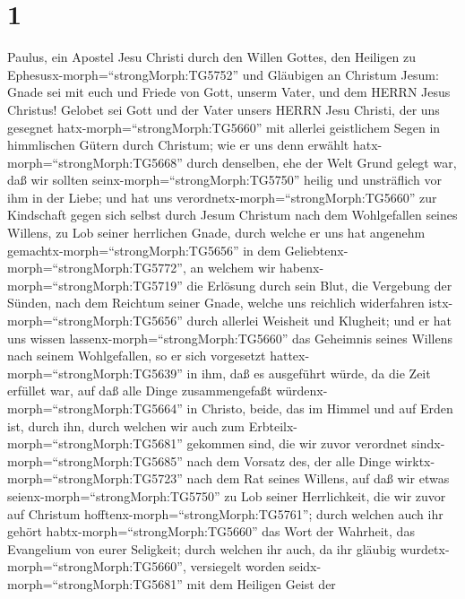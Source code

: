 \hypertarget{section}{%
\section{1}\label{section}}

 Paulus, ein Apostel Jesu Christi durch den Willen Gottes,
den Heiligen zu Ephesusx-morph=``strongMorph:TG5752'' und Gläubigen an
Christum Jesum:  Gnade sei mit euch und Friede von Gott,
unserm Vater, und dem HERRN Jesus Christus!  Gelobet sei
Gott und der Vater unsers HERRN Jesu Christi, der uns gesegnet
hatx-morph=``strongMorph:TG5660'' mit allerlei geistlichem Segen in
himmlischen Gütern durch Christum;  wie er uns denn erwählt
hatx-morph=``strongMorph:TG5668'' durch denselben, ehe der Welt Grund
gelegt war, daß wir sollten seinx-morph=``strongMorph:TG5750'' heilig
und unsträflich vor ihm in der Liebe;  und hat uns
verordnetx-morph=``strongMorph:TG5660'' zur Kindschaft gegen sich selbst
durch Jesum Christum nach dem Wohlgefallen seines Willens, 
zu Lob seiner herrlichen Gnade, durch welche er uns hat angenehm
gemachtx-morph=``strongMorph:TG5656'' in dem
Geliebtenx-morph=``strongMorph:TG5772'',  an welchem wir
habenx-morph=``strongMorph:TG5719'' die Erlösung durch sein Blut, die
Vergebung der Sünden, nach dem Reichtum seiner Gnade, 
welche uns reichlich widerfahren istx-morph=``strongMorph:TG5656'' durch
allerlei Weisheit und Klugheit;  und er hat uns wissen
lassenx-morph=``strongMorph:TG5660'' das Geheimnis seines Willens nach
seinem Wohlgefallen, so er sich vorgesetzt
hattex-morph=``strongMorph:TG5639'' in ihm,  daß es
ausgeführt würde, da die Zeit erfüllet war, auf daß alle Dinge
zusammengefaßt würdenx-morph=``strongMorph:TG5664'' in Christo, beide,
das im Himmel und auf Erden ist, durch ihn,  durch welchen
wir auch zum Erbteilx-morph=``strongMorph:TG5681'' gekommen sind, die
wir zuvor verordnet sindx-morph=``strongMorph:TG5685'' nach dem Vorsatz
des, der alle Dinge wirktx-morph=``strongMorph:TG5723'' nach dem Rat
seines Willens,  auf daß wir etwas
seienx-morph=``strongMorph:TG5750'' zu Lob seiner Herrlichkeit, die wir
zuvor auf Christum hofftenx-morph=``strongMorph:TG5761''; 
durch welchen auch ihr gehört habtx-morph=``strongMorph:TG5660'' das
Wort der Wahrheit, das Evangelium von eurer Seligkeit; durch welchen ihr
auch, da ihr gläubig wurdetx-morph=``strongMorph:TG5660'', versiegelt
worden seidx-morph=``strongMorph:TG5681'' mit dem Heiligen Geist der

